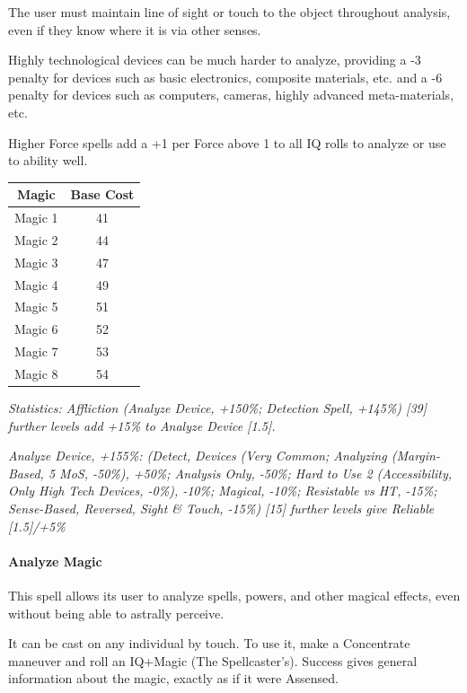 \begin{multicols}{3}
	The user must maintain line of sight or touch to the object throughout analysis, even if they know where it is via other senses.
	
	Highly technological devices can be much harder to analyze, providing a -3 penalty for devices such as basic electronics, composite materials, etc. and a -6 penalty for devices such as computers, cameras, highly advanced meta-materials, etc.
	
	Higher Force spells add a +1 per Force above 1 to all IQ rolls to analyze or use to ability well.
	
	\begin{center}
		\begin{tabular}{|c|c|}
			\hline
			Magic & Base Cost \\
			\hline
			\hline
			Magic 1 & 41 \\
			Magic 2 & 44 \\
			Magic 3 & 47 \\
			Magic 4 & 49 \\
			Magic 5 & 51 \\
			Magic 6 & 52 \\
			Magic 7 & 53 \\
			Magic 8 & 54 \\
			\hline
		\end{tabular}
	\end{center}
	
	\textcolor{OliveGreen}{\textit{ Statistics: Affliction (Analyze Device, +150\%; Detection Spell, +145\%) [39] further levels add +15\% to Analyze Device [1.5].}}
	
	\textcolor{OliveGreen}{\textit{Analyze Device, +155\%: (Detect, Devices (Very Common; Analyzing (Margin-Based, 5 MoS, -50\%), +50\%; Analysis Only, -50\%; Hard to Use 2 (Accessibility, Only High Tech Devices, -0\%), -10\%; Magical, -10\%; Resistable vs HT, -15\%; Sense-Based, Reversed, Sight \& Touch, -15\%) [15] further levels give Reliable [1.5]/+5\%}}
	
	\paragraph{Analyze Magic}
	
	This spell allows its user to analyze spells, powers, and other magical effects, even without being able to astrally perceive.
	
	It can be cast on any individual by touch. To use it, make a Concentrate maneuver and roll an IQ+Magic (The Spellcaster's). Success gives general information about the magic, exactly as if it were Assensed.
	

\end{multicols}
